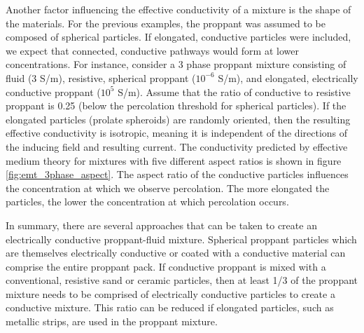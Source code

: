 Another factor influencing the effective conductivity of a mixture is the shape of the materials. For the previous examples, the proppant was assumed to be composed of spherical particles. If elongated, conductive particles were included, we expect that connected, conductive pathways would form at lower concentrations. For instance, consider a 3 phase proppant mixture consisting of fluid (3 S/m), resistive, spherical proppant ($10^{-6}$ S/m), and elongated, electrically conductive proppant ($10^5$ S/m). Assume that the ratio of conductive to resistive proppant is 0.25 (below the percolation threshold for spherical particles). If the elongated particles (prolate spheroids) are randomly oriented, then the resulting effective conductivity is isotropic, meaning it is independent of the directions of the inducing field and resulting current. The conductivity predicted by effective medium theory for mixtures with five different aspect ratios is shown in figure \ref{fig:emt_3phase_aspect}. The aspect ratio of the conductive particles influences the concentration at which we observe percolation. The more elongated the particles, the lower the concentration at which percolation occurs.





In summary, there are several approaches that can be taken to create an electrically conductive proppant-fluid mixture. Spherical proppant particles which are themselves electrically conductive or coated with a conductive material can comprise the entire proppant pack. If conductive proppant is mixed with a conventional, resistive sand or ceramic particles, then at least 1/3 of the proppant mixture needs to be comprised of electrically conductive particles to create a conductive mixture. This ratio can be reduced if elongated particles, such as metallic strips, are used in the proppant mixture.

